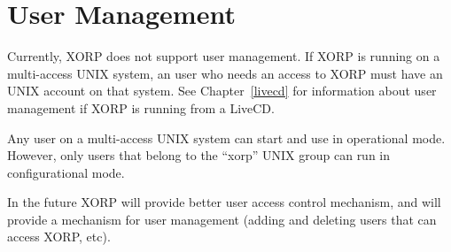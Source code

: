 %
%

\chapter{User Management}

Currently, XORP does not support user management. If XORP is running on a
multi-access UNIX system, an user who needs an access to XORP must have an
UNIX account on that system. See Chapter~\ref{livecd} for information about
user management if XORP is running from a LiveCD.

Any user on a multi-access UNIX system can start and use \xorpsh
in operational mode. However, only users that belong to the ``xorp''
UNIX group can run \xorpsh in configurational mode.

In the future XORP will provide better user access control mechanism,
and will provide a mechanism for user management (\eg adding and deleting
users that can access XORP, etc).









